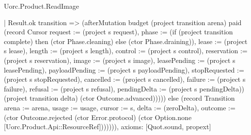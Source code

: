 \begin{lexlean}{Uorc.Product.ReadImage}
\begin{semanticmodule}
{            | Result.ok transition => (afterMutation budget (project transition arena) paid (record Cursor {request := (project s request), phase := (if (project transition complete) then (ctor Phase.cleaning) else (ctor Phase.draining)), lease := (project s lease), length := (project s length), control := (project s control), reservation := (project s reservation), image := (project s image), leasePending := (project s leasePending), payloadPending := (project s payloadPending), stopRequested := (project s stopRequested), cancelled := (project s cancelled), failure := (project s failure), refusal := (project s refusal), pendingDelta := (project s pendingDelta)}) (project transition delta) (ctor Outcome.advanced))))) else (record Transition {arena := arena, usage := usage, cursor := s, delta := (zeroDelta), outcome := (ctor Outcome.rejected (ctor Error.protocol) (ctor Option.none [Uorc.Product.Api::ResourceRef]))})))),
  axioms: [Quot.sound, propext]
}


\end{semanticmodule}
\end{lexlean}
